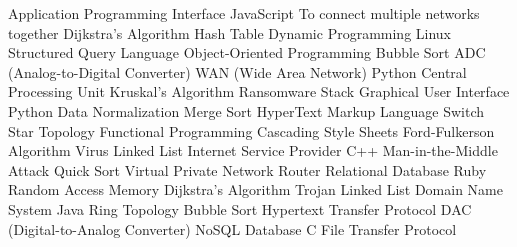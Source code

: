 \answerkey
{} Application Programming Interface
 JavaScript
 To connect multiple networks together
 Dijkstra's Algorithm
 Hash Table
 Dynamic Programming
 Linux
 Structured Query Language
 Object-Oriented Programming
 Bubble Sort
 ADC (Analog-to-Digital Converter)
 WAN (Wide Area Network)
 Python
 Central Processing Unit
 Kruskal's Algorithm
 Ransomware
 Stack
 Graphical User Interface
 Python
 Data Normalization
 Merge Sort
 HyperText Markup Language
 Switch
 Star Topology
 Functional Programming
 Cascading Style Sheets
 Ford-Fulkerson Algorithm
 Virus
 Linked List
 Internet Service Provider
 C++
 Man-in-the-Middle Attack
 Quick Sort
 Virtual Private Network
 Router
 Relational Database
 Ruby
 Random Access Memory
 Dijkstra's Algorithm
 Trojan
 Linked List
 Domain Name System
 Java
 Ring Topology
 Bubble Sort
 Hypertext Transfer Protocol
 DAC (Digital-to-Analog Converter)
 NoSQL Database
 C
 File Transfer Protocol
\endanswerkey